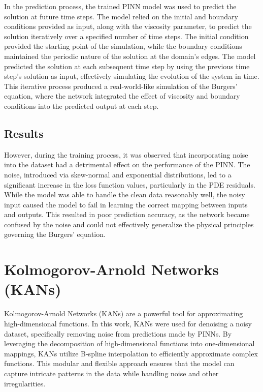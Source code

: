 \documentclass[conference]{IEEEtran}
\begin{document}
In the prediction process, the trained PINN model was used to predict the solution at future time steps. The model relied on the initial and boundary conditions provided as input, along with the viscosity parameter, to predict the solution iteratively over a specified number of time steps. The initial condition provided the starting point of the simulation, while the boundary conditions maintained the periodic nature of the solution at the domain's edges. The model predicted the solution at each subsequent time step by using the previous time step’s solution as input, effectively simulating the evolution of the system in time. This iterative process produced a real-world-like simulation of the Burgers' equation, where the network integrated the effect of viscosity and boundary conditions into the predicted output at each step.

\subsection{Results}
However, during the training process, it was observed that incorporating noise into the dataset had a detrimental effect on the performance of the PINN. The noise, introduced via skew-normal and exponential distributions, led to a significant increase in the loss function values, particularly in the PDE residuals. While the model was able to handle the clean data reasonably well, the noisy input caused the model to fail in learning the correct mapping between inputs and outputs. This resulted in poor prediction accuracy, as the network became confused by the noise and could not effectively generalize the physical principles governing the Burgers' equation. 


\section{Kolmogorov-Arnold Networks (KANs)}
Kolmogorov-Arnold Networks (KANs) are a powerful tool for approximating high-dimensional functions. In this work, KANs were used for denoising a noisy dataset, specifically removing noise from predictions made by PINNs. By leveraging the decomposition of high-dimensional functions into one-dimensional mappings, KANs utilize B-spline interpolation to efficiently approximate complex functions. This modular and flexible approach ensures that the model can capture intricate patterns in the data while handling noise and other irregularities.
\end{document}

